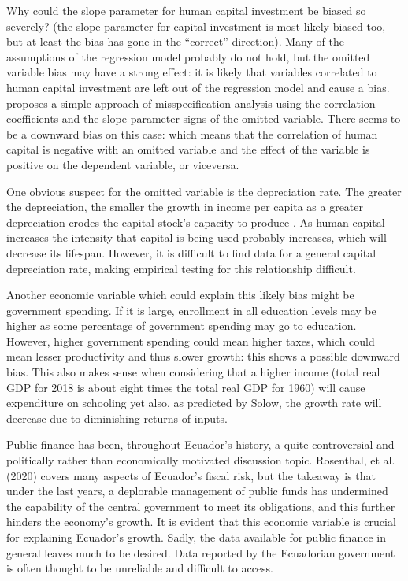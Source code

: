 \documentclass[12pt,twoside,a4paper]{article}
\numberwithin{equation}{section}
\begin{document}
Why could the slope parameter for human capital investment be biased so severely? (the slope parameter for capital investment is most likely biased too, but at least the bias has gone in the “correct” direction). Many of the assumptions of the regression model probably do not hold, but the omitted variable bias may have a strong effect: it is likely that variables correlated to human capital investment are left out of the regression model and cause a bias. \textcite{Woolridge.2016} proposes a simple approach of misspecification analysis using the correlation coefficients and the slope parameter signs of the omitted variable. There seems to be a downward bias on this case: which means that the correlation of human capital is negative with an omitted variable and the effect of the variable is positive on the dependent variable, or viceversa.

One obvious suspect for the omitted variable is the depreciation rate. The greater the depreciation, the smaller the growth in income per capita as a greater depreciation erodes the capital stock's capacity to produce \parencite{Abel.2014}. As human capital increases the intensity that capital is being used probably increases, which will decrease its lifespan. However, it is difficult to find data for a general capital depreciation rate, making empirical testing for this relationship difficult. 

Another economic variable which could explain this likely bias might be government spending. If it is large, enrollment in all education levels may be higher as some percentage of government spending may go to education. However, higher government spending could mean higher taxes, which could mean lesser productivity and thus slower growth: this shows a possible downward bias. This also makes sense when considering that a higher income (total real GDP for 2018 is about eight times the total real GDP for 1960) will cause expenditure on schooling yet also, as predicted by Solow, the growth rate will decrease due to diminishing returns of inputs.

Public finance has been, throughout Ecuador's history, a quite controversial and politically rather than economically motivated discussion topic. Rosenthal, et al. (2020) covers many aspects of Ecuador's fiscal risk, but the takeaway is that under the last years, a deplorable management of public funds has undermined the capability of the central government to meet its obligations, and this further hinders the economy's growth. It is evident that this economic variable is crucial for explaining Ecuador's growth. Sadly, the data available for public finance in general leaves much to be desired. Data reported by the Ecuadorian government is often thought to be unreliable and difficult to access. 
\end{document}
